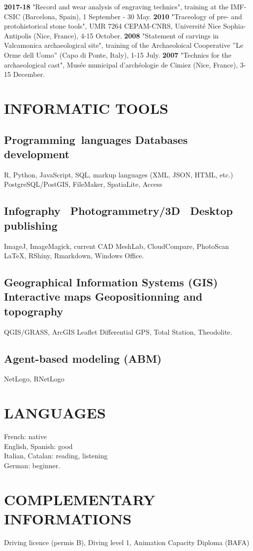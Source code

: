 \documentclass[11pt]{report} %
\begin{document}
\textbf{2017-18 } "Record and wear analysis of engraving technics", training at the IMF-CSIC (Barcelona, Spain), 1 September - 30 May.
\smallbreak
\textbf{2010 } "Traceology of pre- and protohistorical stone tools", UMR 7264 CEPAM-CNRS, Universit\'{e} Nice Sophia-Antipolis (Nice, France), 4-15 October.
\smallbreak
\textbf{2008 } "Statement of carvings in Valcamonica archaeological site", training of the Archaeoloical Cooperative ''Le Orme dell Uomo'' (Capo di Ponte, Italy), 1-15 July.
\smallbreak
\textbf{2007 } "Technics for the archaeological cast", Mus\'{e}e municipal d'arch\'{e}ologie de Cimiez (Nice, France), 3-15 December.

\section*{INFORMATIC TOOLS}

\subsection*{Programming~languages {\textbar} Databases development}

R, Python, JavaScript, SQL, markup languages (XML, JSON, HTML, etc.)~\textbf{{\textbar}} PostgreSQL/PostGIS, FileMaker, SpatiaLite, Access

\subsection*{Infography~{\textbar} Photogrammetry/3D~{\textbar} Desktop publishing}

ImageJ, ImageMagick, current CAD \textbf{{\textbar}} MeshLab, CloudCompare, PhotoScan \textbf{{\textbar}} \LaTeX, RShiny, Rmarkdown, Windows Office.\textbf{}

\subsection*{Geographical Information Systems (GIS) {\textbar} Interactive maps {\textbar} Geopositionning and topography}

QGIS/GRASS, ArcGIS {\textbar} Leaflet {\textbar} Differential GPS, Total Station, Theodolite.

\subsection*{Agent-based modeling (ABM)}

NetLogo, RNetLogo

\section*{LANGUAGES}

French: native \\
English, Spanish: good \\
Italian, Catalan: reading, listening \\
German: beginner.

\section*{COMPLEMENTARY INFORMATIONS}

Driving licence (permis B), Diving level 1, Animation Capacity Diploma (BAFA)
\end{document}
